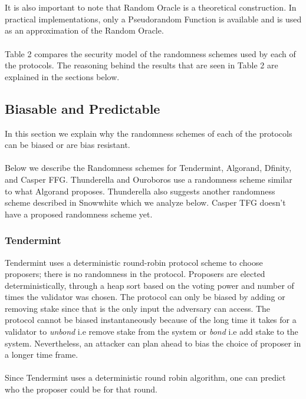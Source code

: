 \documentclass[10pt,journal,compsoc]{IEEEtran}
\begin{document}
\\\\
It is also important to note that Random Oracle is a theoretical construction. In practical implementations, only a Pseudorandom Function is available and is used as an approximation of the Random Oracle. 
\\\\
Table 2 compares the security model of the  randomness schemes used by each of the protocols. The reasoning behind the results that are seen in Table 2 are explained in the sections below.

\subsection{Biasable and Predictable}
In this section we explain why the randomness schemes of each of the protocols can be biased or are bias resistant. 
\\\\
Below we describe the Randomness schemes for Tendermint, Algorand, Dfinity, and Casper FFG. Thunderella and Ouroboros use a randomness scheme similar to what Algorand proposes. Thunderella also suggests another randomness scheme described in Snowwhite \cite{SnowWhite} which we analyze below. Casper TFG doesn't have a proposed randomness scheme yet. 
\subsubsection{Tendermint}
Tendermint uses a deterministic round-robin protocol scheme to choose proposers; there is no randomness in the protocol. Proposers are elected deterministically, through a heap sort based on the voting power and number of times the validator was chosen. The protocol can only be biased by adding or removing stake since that is the only input the adversary can access. The protocol cannot be biased instantaneously because of the long time it takes for a validator to \emph{unbond} i.e remove stake from the system or \emph{bond} i.e add stake to the system. Nevertheless, an attacker can plan ahead to bias the choice of proposer in a longer time frame.
\\\\
Since Tendermint uses a deterministic round robin algorithm, one can predict who the proposer could be for that round. 
\end{document}
